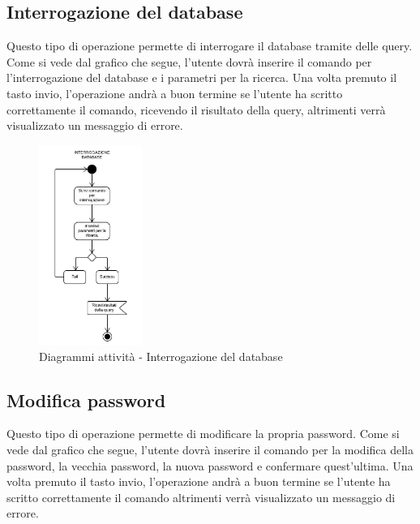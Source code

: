 \documentclass{scalatekids-article}
\begin{document}
\subsection{Interrogazione del database}

Questo tipo di operazione permette di interrogare il database tramite delle
query. Come si vede dal grafico che segue, l'utente dovrà inserire il comando
per l'interrogazione del database e i parametri per la ricerca. Una volta
premuto il tasto invio, l'operazione andrà a buon termine se l'utente ha
scritto correttamente il comando, ricevendo il risultato della query,
altrimenti verrà visualizzato un messaggio di errore.

\begin{figure}[H]
  \begin{center}
    \includegraphics[width=0.3\textwidth, keepaspectratio]{img/diagrammiAttivita/query.jpeg}
    \caption{Diagrammi attività - Interrogazione del database}
  \end{center}
\end{figure}

\subsection{Modifica password}

Questo tipo di operazione permette di modificare la propria password. Come si
vede dal grafico che segue, l'utente dovrà inserire il comando per la modifica
della password, la vecchia password, la nuova password e confermare
quest'ultima. Una volta premuto il tasto invio, l'operazione andrà a buon
termine se l'utente ha scritto correttamente il comando altrimenti verrà
visualizzato un messaggio di errore.
\end{document}
